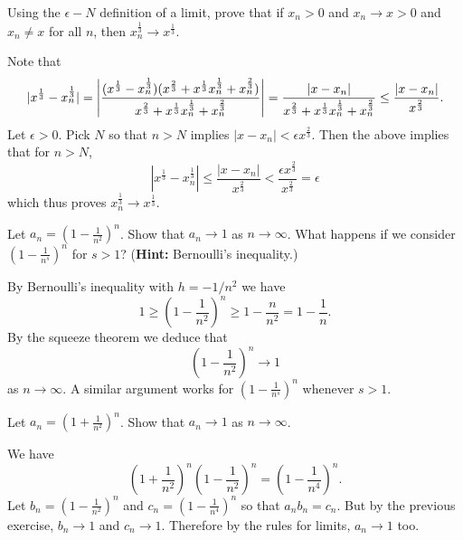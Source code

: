 \documentclass[11pt,dvipsnames]{book}
\numberwithin{equation}{section} %
\numberwithin{figure}{section} %
\numberwithin{table}{section} %
\begin{document}
\begin{exercise} Using the $\epsilon-N$ definition of a limit, prove that if $x_n>0$ and $x_n\rightarrow x>0$ and $x_n\neq x$ for all $n$, then $x_{n}^{\frac{1}{3}}\rightarrow x^{\frac{1}{3}}$. 

\begin{solution}
Note that
\[
|x^{\frac{1}{3}}-x_{n}^{\frac{1}{3}}|
=\left| \frac{ (x^{\frac{1}{3}}-x_{n}^{\frac{1}{3}})(x^{\frac{2}{3}}+x^{\frac{1}{3}}x_{n}^{\frac{1}{3}}+x_{n}^{\frac{2}{3}})}{x^{\frac{2}{3}}+x^{\frac{1}{3}}x_{n}^{\frac{1}{3}}+x_{n}^{\frac{2}{3}}} \right|
 = \frac{|x-x_{n}|}{x^{\frac{2}{3}}+x^{\frac{1}{3}}x_{n}^{\frac{1}{3}}+x_{n}^{\frac{2}{3}}}
 \leq \frac{|x-x_{n}|}{x^{\frac{2}{3}}}.\\
\]
Let $\epsilon>0$. Pick $N$ so that $n> N$ implies $|x-x_{n}|< \epsilon x^{\frac{2}{3}}$. Then the above implies that for $n> N$,
\[
|x^{\frac{1}{3}}-x_{n}^{\frac{1}{3}}|
\leq  \frac{|x-x_{n}|}{x^{\frac{2}{3}}}
<\frac{\epsilon x^{\frac{2}{3}}}{x^{\frac{2}{3}}}=\epsilon
\]
which thus proves $x_{n}^{\frac{1}{3}}\rightarrow x^{\frac{1}{3}}$. 
\end{solution}

\end{exercise}

\begin{exercise}
Let $a_n = \left( 1- \frac{1}{n^2}\right)^n$. Show that $a_n \to 1$ as $n \to \infty$. What happens if we consider $\left(1-\frac{1}{n^s}\right)^n$ for $s > 1$? ({\bf Hint:} Bernoulli's inequality.)
\begin{solution}
By Bernoulli's inequality with $ h= -1/n^2$ we have
\[1 \geq \left( 1- \frac{1}{n^2}\right)^n \geq 1 - \frac{n}{n^2}
= 1 - \frac{1}{n}.\] 
By the squeeze theorem we deduce that 
\[ \left( 1- \frac{1}{n^2}\right)^n \to 1\]
as $n \to \infty$. A similar  argument works for $\left(1-\frac{1}{n^s}\right)^n$ 
whenever $s > 1$. 
\end{solution}
\end{exercise}

\begin{exercise}
Let $a_n = \left( 1+ \frac{1}{n^2}\right)^n$. Show that $a_n \to 1$ as $n \to \infty$.
\end{exercise}
\begin{solution}
We have
\[ \left( 1+ \frac{1}{n^2}\right)^n\left( 1- \frac{1}{n^2}\right)^n=\left( 1- \frac{1}{n^4}\right)^n.\] 
Let $b_n = \left( 1- \frac{1}{n^2}\right)^n$ and $c_n = \left( 1- \frac{1}{n^4}\right)^n$ so that 
$a_n b_n = c_n$. But by the previous exercise, $b_n \to 1$ and $c_n \to 1$. Therefore by the rules for limits, $a_n \to 1$ too.

\end{solution}
\end{document}
